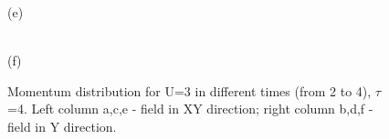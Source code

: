 \begin{figure}[h!]
\begin{minipage}[h]{0.43\linewidth}
\end{minipage}
\begin{minipage}[h]{0.43\linewidth}
 (e) \\
\end{minipage}
\hfill
\begin{minipage}[h]{0.43\linewidth}
 \\(f)
\end{minipage}
\caption{Momentum distribution for U=3 in different times (from 2 to 4), $\tau$=4. Left column a,c,e - field in XY direction; right column b,d,f - field in Y direction.}
\label{fig:md_u3_A_max}
\end{figure}


